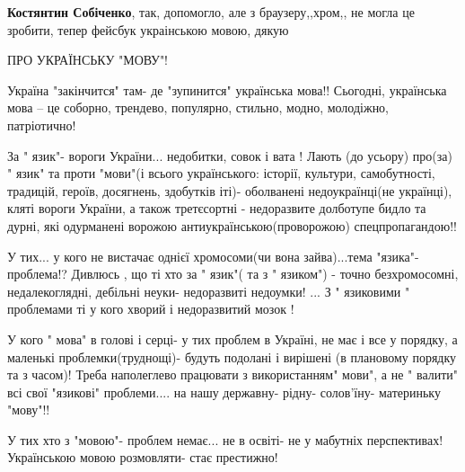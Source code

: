 \begin{itemize}
\begin{itemize}
 
\textbf{Костянтин Собіченко}, так, допомогло, але з браузеру,,хром,, не могла це зробити, тепер фейсбук украінською мовою, дякую

\end{itemize}

 

ПРО УКРАЇНСЬКУ "МОВУ"!

Україна "закінчится" там- де "зупинится" українська мова!! Сьогодні, українська
мова – це соборно, трендево, популярно, стильно, модно, молодіжно, патріотично!

За " язик"- вороги України... недобитки, совок і вата ! Лають (до усьору)
про(за) " язик" та проти "мови"(і всього українського: історії, культури,
самобутності, традицій, героїв, досягнень, здобутків іті)- оболванені
недоукраїнці(не українці), кляті вороги України, а також третєсортні -
недоразвите долботупе бидло та дурні, які одурманені ворожою
антиукраїнською(проворожою) спецпропагандою!!

У тих... у кого не вистачає однієї хромосоми(чи вона зайва)...тема "язика"-
проблема!? Дивлюсь , що ті хто за " язик"( та з " язиком") - точно
безхромосомні, недалекоглядні, дебільні неуки- недоразвиті недоумки! ... З "
язиковими " проблемами ті у кого хворий і недоразвитий мозок !

У кого " мова" в голові і серці- у тих проблем в Україні, не має і все у
порядку, а маленькі проблемки(труднощі)- будуть подолані і вирішені (в
плановому порядку та з часом)! Треба наполеглево працювати з використанням"
мови", а не " валити" всі свої "язикові" проблеми.... на нашу державну- рідну-
солов'їну- материньку "мову"!!

У тих хто з "мовою"- проблем немає... не в освіті- не у мабутніх перспективах!
Українською мовою розмовляти- стає престижно!

\end{itemize}

